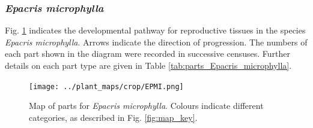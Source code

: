\documentclass[10pt,twoside]{article}\usepackage[]{graphicx}\usepackage[]{color}
\begin{document}
\clearpage

\subsubsection{\emph{Epacris microphylla}}

Fig. \ref{fig:map_Epacris_microphylla} indicates the developmental pathway for reproductive tissues in the species \emph{Epacris microphylla}. Arrows indicate the direction of progression.  The numbers of each part shown in the diagram were recorded in successive censuses. Further details on each part type are given in Table \ref{tab:parts_Epacris_microphylla}.


\begin{figure}[h]
\centering
\texttt{[image: ../plant\_maps/crop/EPMI.png]}
\caption{Map of parts for \emph{Epacris microphylla}. Colours indicate different categories, as described in Fig. \ref{fig:map_key}.}
\label{fig:map_Epacris_microphylla}
\end{figure}
\end{document}
